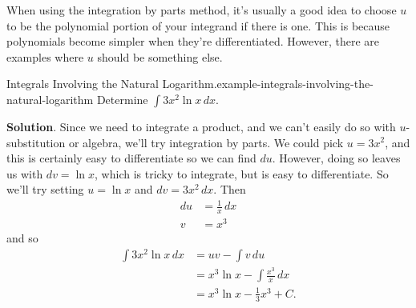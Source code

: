 \documentclass[10pt,]{book}
\numberwithin{equation}{section}
\begin{document}
\hypertarget{p-505}{}%
When using the integration by parts method, it's usually a good idea to choose \(u\) to be the polynomial portion of your integrand if there is one. This is because polynomials become simpler when they're differentiated. However, there are examples where \(u\) should be something else.%
\begin{example}{Integrals Involving the Natural Logarithm.}{example-integrals-involving-the-natural-logarithm}%
\hypertarget{p-506}{}%
Determine \(\int 3x^{2}\ln x\,dx\).%
\par\smallskip%
\noindent\textbf{Solution}.\hypertarget{solution-111}{}\quad%
\hypertarget{p-507}{}%
Since we need to integrate a product, and we can't easily do so with \(u\)-substitution or algebra, we'll try integration by parts. We could pick \(u = 3x^{2}\), and this is certainly easy to differentiate so we can find \(du\). However, doing so leaves us with \(dv = \ln x\), which is tricky to integrate, but is easy to differentiate. So we'll try setting \(u = \ln x\) and \(dv = 3x^{2}\,dx\). Then%
%
\begin{align*}
du & = \frac{1}{x}\,dx \\
v & = x^{3} 
\end{align*}
\hypertarget{p-508}{}%
and so%
%
\begin{align*}
\int 3x^{2}\ln x\,dx & = uv - \int v\,du \\
& = x^{3}\ln x - \int \frac{x^{3}}{x}\,dx \\
& = x^{3}\ln x - \frac{1}{3}x^{3} + C. 
\end{align*}
\end{example}
\end{document}
